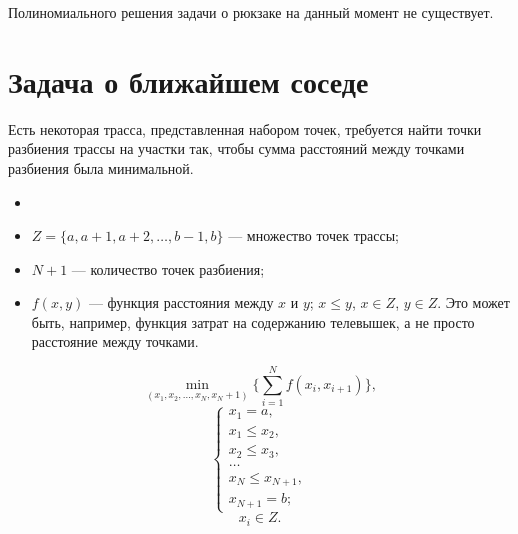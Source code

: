 Полиномиального решения задачи о рюкзаке на данный момент не существует.

\section{Задача о ближайшем соседе}

\label{pr:nearest_neighbor_problem}

Есть некоторая трасса, представленная набором точек, требуется найти точки разбиения трассы на участки так, чтобы сумма расстояний между точками разбиения была минимальной.

\mathmodel

\begin{itemize}[nosep]
	\item[] 
	
	\item $Z = \{a, a+1, a+2, \dots, b - 1, b\}$ --- множество точек трассы;
	
	\item $N+1$ --- количество точек разбиения;
	
	\item $f(x, y)$ --- функция расстояния между $x$ и $y$; $x \le y$, $x \in Z$, $y \in Z$. Это может быть, например, функция затрат на содержанию телевышек, а не просто расстояние между точками.
\end{itemize}

\[
\min_{(x_1, x_2, \dots, x_{N}, x_N+1)} \bigg\{\sum_{i=1}^N f(x_i, x_{i+1})\bigg\},
\]
\[
\begin{cases}
	x_1 = a, \\
	x_1 \le x_2, \\
	x_2 \le x_3, \\
	\dots \\
	x_N \le x_{N+1}, \\
	x_{N+1}=b;
 \end{cases}
\]
\[
x_i \in Z.
\]

